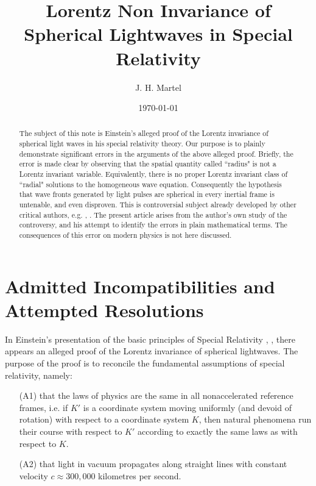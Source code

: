 \documentclass[12pt]{amsart}
\theoremstyle{definition}
\theoremstyle{remark}
\begin{document}
\title{Lorentz Non Invariance of Spherical Lightwaves in Special Relativity}


\author{J. H. Martel}
\date{\today}
\maketitle

\begin{abstract}
The subject of this note is Einstein's alleged proof of the Lorentz invariance of spherical light waves in his special relativity theory. Our purpose is to plainly demonstrate significant errors in the arguments of the above alleged proof. Briefly, the error is made clear by observing that the spatial quantity called ``radius" is not a Lorentz invariant variable. Equivalently, there is no proper Lorentz invariant class of ``radial" solutions to the homogeneous wave equation. Consequently the hypothesis that wave fronts generated by light pulses are spherical in every inertial frame is untenable, and even disproven. This is controversial subject already developed by other critical authors, e.g. \cite{bryant}, \cite{crothers}. The present article arises from the author's own study of the controversy, and his attempt to identify the errors in plain mathematical terms. The consequences of this error on modern physics is not here discussed.

\end{abstract}

\tableofcontents

\section{Admitted Incompatibilities and Attempted Resolutions}

In Einstein's presentation of the basic principles of Special Relativity \cite{einstein2019relativity}, \cite{einstein1905electrodynamics}, there appears an alleged proof of the Lorentz invariance of spherical lightwaves. The purpose of the proof is to reconcile the fundamental assumptions of special relativity, namely:
\begin{itemize}

\item[(A1)] that the laws of physics are the same in all nonaccelerated reference frames, i.e. if $K'$ is a coordinate system moving uniformly (and devoid of rotation) with respect to a coordinate system $K$, then natural phenomena run their course with respect to $K'$ according to exactly the same laws as with respect to $K$. 

\item[(A2)] that light in vacuum propagates along straight lines with constant velocity $c\approx 300,000$ kilometres per second.

\end{itemize}
\end{document}
